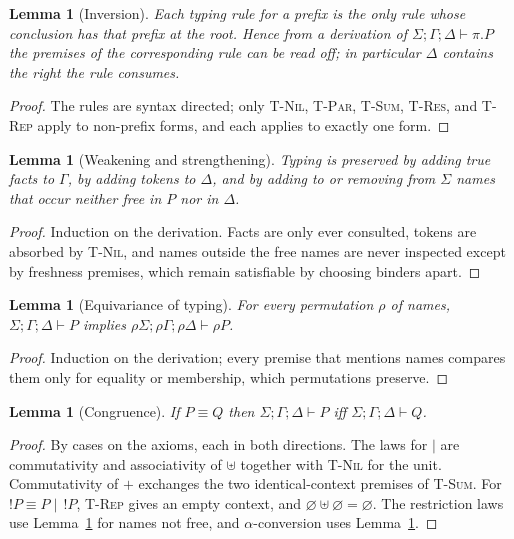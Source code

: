 \documentclass[11pt,openany]{book}
\newtheorem{lemma}[theorem]{Lemma}
\theoremstyle{remark}
\begin{document}
\begin{lemma}[Inversion]\label{lem:inv}
Each typing rule for a prefix is the only rule whose conclusion has that
prefix at the root. Hence from a derivation of
$\Sigma;\Gamma;\Delta\vdash\pi.P$ the premises of the corresponding rule
can be read off; in particular $\Delta$ contains the right the rule
consumes.
\end{lemma}

\begin{proof}
The rules are syntax directed; only \textsc{T-Nil}, \textsc{T-Par},
\textsc{T-Sum}, \textsc{T-Res}, and \textsc{T-Rep} apply to non-prefix
forms, and each applies to exactly one form.
\end{proof}

\begin{lemma}[Weakening and strengthening]\label{lem:weak}
Typing is preserved by adding true facts to $\Gamma$, by adding tokens to
$\Delta$, and by adding to or removing from $\Sigma$ names that occur
neither free in $P$ nor in $\Delta$.
\end{lemma}

\begin{proof}
Induction on the derivation. Facts are only ever consulted, tokens are
absorbed by \textsc{T-Nil}, and names outside the free names are never
inspected except by freshness premises, which remain satisfiable by
choosing binders apart.
\end{proof}

\begin{lemma}[Equivariance of typing]\label{lem:tequiv}
For every permutation $\rho$ of names,
$\Sigma;\Gamma;\Delta\vdash P$ implies
$\rho\Sigma;\rho\Gamma;\rho\Delta\vdash\rho P$.
\end{lemma}

\begin{proof}
Induction on the derivation; every premise that mentions names compares
them only for equality or membership, which permutations preserve.
\end{proof}

\begin{lemma}[Congruence]\label{lem:congr}
If $P\equiv Q$ then $\Sigma;\Gamma;\Delta\vdash P$ iff
$\Sigma;\Gamma;\Delta\vdash Q$.
\end{lemma}

\begin{proof}
By cases on the axioms, each in both directions. The laws for $\mid$ are
commutativity and associativity of $\uplus$ together with \textsc{T-Nil}
for the unit. Commutativity of $+$ exchanges the two identical-context
premises of \textsc{T-Sum}. For $!P\equiv P\mid\,!P$, \textsc{T-Rep} gives
an empty context, and $\varnothing\uplus\varnothing=\varnothing$. The
restriction laws use Lemma~\ref{lem:weak} for names not free, and
$\alpha$-conversion uses Lemma~\ref{lem:tequiv}.
\end{proof}
\end{document}
